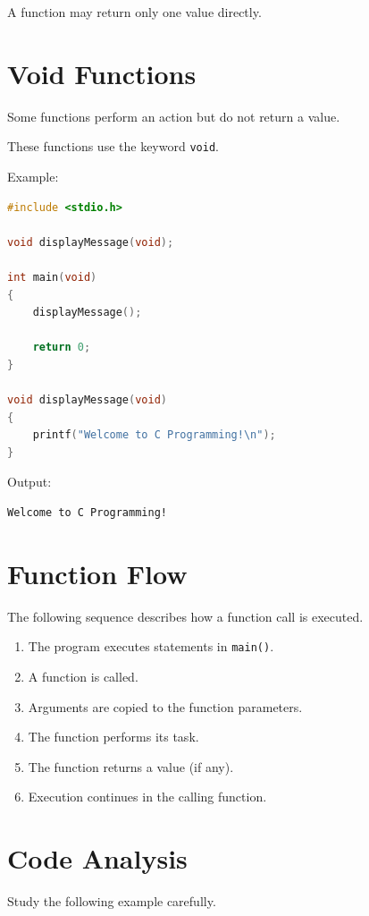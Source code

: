 \documentclass[12pt,openany]{book}
\begin{document}
A function may return only one value directly.

\section{Void Functions}

Some functions perform an action but do not return a value.

These functions use the keyword \texttt{void}.

Example:

\begin{lstlisting}[language=C]
#include <stdio.h>

void displayMessage(void);

int main(void)
{
    displayMessage();

    return 0;
}

void displayMessage(void)
{
    printf("Welcome to C Programming!\n");
}
\end{lstlisting}

Output:

\begin{lstlisting}
Welcome to C Programming!
\end{lstlisting}

\section{Function Flow}

The following sequence describes how a function call is executed.

\begin{enumerate}
    \item The program executes statements in \texttt{main()}.
    \item A function is called.
    \item Arguments are copied to the function parameters.
    \item The function performs its task.
    \item The function returns a value (if any).
    \item Execution continues in the calling function.
\end{enumerate}

\section{Code Analysis}

Study the following example carefully.
\end{document}
